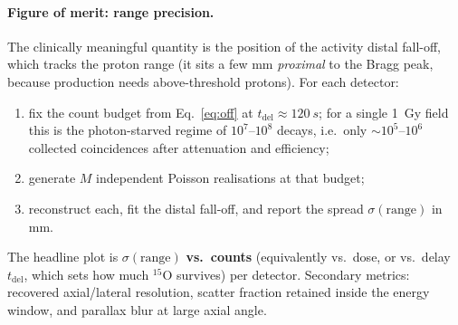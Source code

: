 \documentclass[11pt]{article}
\newcommand{\Ox}[1]{{}^{#1}\mathrm{O}}
\begin{document}
\paragraph{Figure of merit: range precision.}
The clinically meaningful quantity is the position of the activity distal
fall-off, which tracks the proton range (it sits a few mm \emph{proximal} to the
Bragg peak, because production needs above-threshold protons). For each detector:
\begin{enumerate}[nosep]
\item fix the count budget from Eq.~\eqref{eq:off} at $t_{\mathrm{del}}\approx\SI{120}{s}$;
for a single \SI{1}{Gy} field this is the photon-starved regime of $10^{7}$--$10^{8}$
decays, i.e.\ only $\sim\!10^{5}$--$10^{6}$ collected coincidences after attenuation
and efficiency;
\item generate $M$ independent Poisson realisations at that budget;
\item reconstruct each, fit the distal fall-off, and report the spread
$\sigma(\text{range})$ in mm.
\end{enumerate}
The headline plot is $\sigma(\text{range})$ \textbf{vs.\ counts} (equivalently vs.\
dose, or vs.\ delay $t_{\mathrm{del}}$, which sets how much $\Ox{15}$ survives) per
detector. Secondary metrics: recovered axial/lateral resolution, scatter fraction
retained inside the energy window, and parallax blur at large axial angle.
\end{document}
